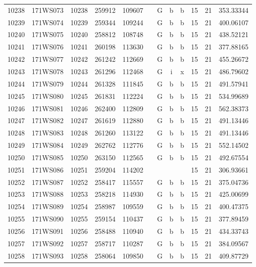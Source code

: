 \begin{tabular}{|*{12}{c|}}
10238 & 171WS073 & 10238 & 259912 & 109607 &  & G & b & b & 15 & 21 & 353.33344 \\ 
10239 & 171WS074 & 10239 & 259344 & 109244 &  & G & b & b & 15 & 21 & 400.06107 \\ 
10240 & 171WS075 & 10240 & 258812 & 108748 &  & G & b & b & 15 & 21 & 438.52121 \\ 
10241 & 171WS076 & 10241 & 260198 & 113630 &  & G & b & b & 15 & 21 & 377.88165 \\ 
10242 & 171WS077 & 10242 & 261242 & 112669 &  & G & b & b & 15 & 21 & 455.26672 \\ 
10243 & 171WS078 & 10243 & 261296 & 112468 &  & G & i & x & 15 & 21 & 486.79602 \\ 
10244 & 171WS079 & 10244 & 261328 & 111845 &  & G & b & b & 15 & 21 & 491.57941 \\ 
10245 & 171WS080 & 10245 & 261831 & 112224 &  & G & b & b & 15 & 21 & 534.99689 \\ 
10246 & 171WS081 & 10246 & 262400 & 112809 &  & G & b & b & 15 & 21 & 562.38373 \\ 
10247 & 171WS082 & 10247 & 261619 & 112880 &  & G & b & b & 15 & 21 & 491.13446 \\ 
10248 & 171WS083 & 10248 & 261260 & 113122 &  & G & b & b & 15 & 21 & 491.13446 \\ 
10249 & 171WS084 & 10249 & 262762 & 112776 &  & G & b & b & 15 & 21 & 552.14502 \\ 
10250 & 171WS085 & 10250 & 263150 & 112565 &  & G & b & b & 15 & 21 & 492.67554 \\ 
10251 & 171WS086 & 10251 & 259204 & 114202 &  &  &  &  & 15 & 21 & 306.93661 \\ 
10252 & 171WS087 & 10252 & 258417 & 115557 &  & G & b & b & 15 & 21 & 375.04736 \\ 
10253 & 171WS088 & 10253 & 258218 & 114930 &  & G & b & b & 15 & 21 & 425.00699 \\ 
10254 & 171WS089 & 10254 & 258987 & 109559 &  & G & b & b & 15 & 21 & 400.47375 \\ 
10255 & 171WS090 & 10255 & 259154 & 110437 &  & G & b & b & 15 & 21 & 377.89459 \\ 
10256 & 171WS091 & 10256 & 258488 & 110940 &  & G & b & b & 15 & 21 & 434.33743 \\ 
10257 & 171WS092 & 10257 & 258717 & 110287 &  & G & b & b & 15 & 21 & 384.09567 \\ 
10258 & 171WS093 & 10258 & 258064 & 109850 &  & G & b & b & 15 & 21 & 409.87729 \\ 

\end{tabular}
